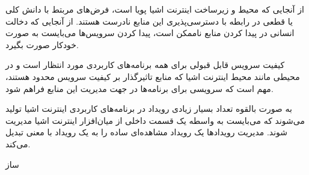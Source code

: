 \documentclass[]{./reports}
\begin{document}
از آنجایی که محیط و زیرساخت اینترنت اشیا پویا است، فرض‌های مربتط با دانش کلی یا قطعی در رابطه با دسترسی‌پذیری این
منابع نادرست هستند.
از آنجایی که دخالت انسانی در پیدا کردن منابع ناممکن است، پیدا کردن سرویس‌ها می‌بایست به صورت خودکار صورت بگیرد.


کیفیت سرویس قابل قبولی برای همه برنامه‌های کاربردی مورد انتظار است و در محیطی مانند محیط اینترنت اشیا که منابع تاثیرگذار بر کیفیت سرویس
محدود هستند، مهم است که سرویسی برای برنامه‌ها در جهت مدیریت این منابع فراهم شود.


به صورت بالقوه تعداد بسیار زیادی رویداد در برنامه‌های کاربردی اینترنت اشیا تولید می‌شوند
که می‌بایست به واسطه یک قسمت داخلی از میان‌افزار اینترنت اشیا مدیریت شوند.
مدیریت رویدادها یک رویداد مشاهده‌ای ساده را به یک رویداد با معنی تبدیل می‌کند.



‌ساز
\end{document}
